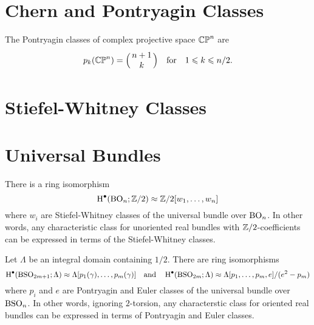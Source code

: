 
\section{Chern and Pontryagin Classes}

\begin{proposition}\label{prop:pontryagin_classes_of_CPn}
  The Pontryagin classes of complex projective space $\mathbb{CP}^n$ are
  \[
    p_k(\CP^n) = \binom{n+1}{k}\quad\textrm{for}\quad 1\leq k \leq n/2.
  \]
\end{proposition}

\section{Stiefel-Whitney Classes}\label{sec:stiefel-whitney_classes}

\section{Universal Bundles}\label{sec:universal_bundles}

\cite{milnorstasheff1974characteristic}
\cite{botttu1982differential}

\begin{theorem}\label{thm:cohomology_of_BO}
  There is a ring isomorphism
  \[
    \operatorname{H}^\bullet({\operatorname{BO}}_n; \mathbb{Z}/2) \approx \mathbb{Z}/2[w_1,\ldots, w_n]
  \]
  where $w_i$ are Stiefel-Whitney classes of the universal bundle over ${\operatorname{BO}}_n$. In other words, any characteristic class for unoriented real bundles with $\mathbb{Z}/2$-coefficients can be expressed in terms of the Stiefel-Whitney classes.
\end{theorem}

\begin{theorem}\label{thm:cohomology_of_BSO}
  Let $\Lambda$ be an integral domain containing $1/2$. There are ring isomorphisms
  \[
      \operatorname{H}^\bullet({\operatorname{BSO}}_{2m+1}; \Lambda) \approx \Lambda[p_1(\gamma), \ldots, p_m(\gamma)]
      \quad\textrm{and}\quad
      \operatorname{H}^\bullet({\operatorname{BSO}}_{2m}; \Lambda) \approx \Lambda[p_1, \ldots, p_m, e]/(e^2-p_m)
  \]
  where $p_i$ and $e$ are Pontryagin and Euler classes of the universal bundle over ${\operatorname{BSO}}_n$.
  In other words, ignoring $2$-torsion, any characterstic class for oriented real bundles can be expressed in terms of Pontryagin and Euler classes.
\end{theorem}
